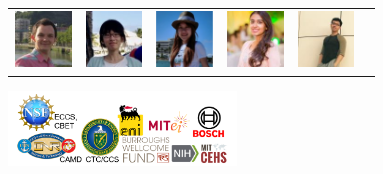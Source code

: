 \documentclass[xcolor=dvipsnames]{beamer}
\begin{document}
\begin{frame}
\begin{table}[]
\begin{tabular}{llllll}
		\includegraphics[width=1.5cm]{img/group/jp.jpg}  & \includegraphics[width=1.5cm]{img/group/mengyi.jpg}  & \includegraphics[width=1.5cm]{img/group/qing.png}  & \includegraphics[width=1.5cm]{img/group/rimsha.jpg} & \includegraphics[width=1.5cm]{img/group/zhongyue.jpg} &  \\
	\end{tabular}
\end{table}
\includegraphics[height=2cm]{img/group/logos.png} 
\end{frame}
\end{document}
